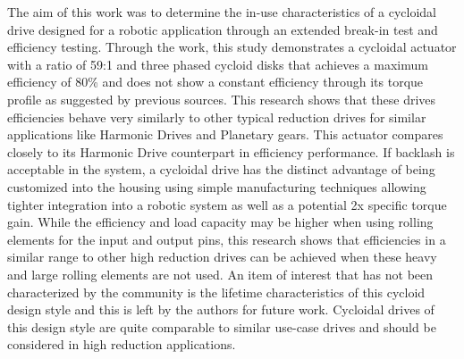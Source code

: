 The aim of this work was to determine the in-use characteristics of a cycloidal drive designed for a robotic application through an extended break-in test and efficiency testing. Through the work, this study demonstrates a cycloidal actuator with a ratio of 59:1 and three phased cycloid disks that achieves a maximum efficiency of 80\% and does not show a constant efficiency through its torque profile as suggested by previous sources.
This research shows that these drives efficiencies behave very similarly to other typical reduction drives for similar applications like Harmonic Drives and Planetary gears.
This actuator compares closely to its Harmonic Drive counterpart in efficiency performance.
If backlash is acceptable in the system, a cycloidal drive has the distinct advantage of being customized into the housing using simple manufacturing techniques allowing tighter integration into a robotic system as well as a potential 2x specific torque gain.
While the efficiency and load capacity may be higher when using rolling elements for the input and output pins, this research shows that efficiencies in a similar range to other high reduction drives can be achieved when these heavy and large rolling elements are not used.
An item of interest that has not been characterized by the community is the lifetime characteristics of this cycloid design style and this is left by the authors for future work.
Cycloidal drives of this design style are quite comparable to similar use-case drives and should be considered in high reduction applications.

